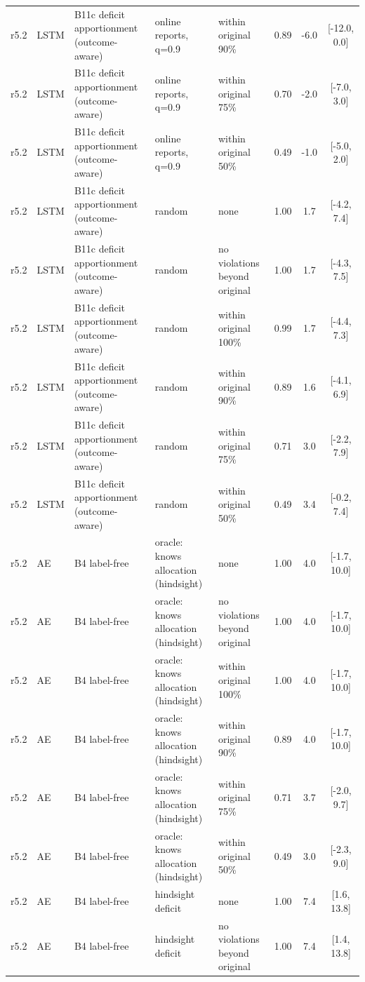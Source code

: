 \begin{longtable}{lllp{4.2cm}p{3.4cm}ccc}
r5.2 & LSTM & B11c deficit apportionment (outcome-aware) & online reports, q=0.9 & within original 90\% & 0.89 & -6.0 & [-12.0, 0.0] \\
r5.2 & LSTM & B11c deficit apportionment (outcome-aware) & online reports, q=0.9 & within original 75\% & 0.70 & -2.0 & [-7.0, 3.0] \\
r5.2 & LSTM & B11c deficit apportionment (outcome-aware) & online reports, q=0.9 & within original 50\% & 0.49 & -1.0 & [-5.0, 2.0] \\
r5.2 & LSTM & B11c deficit apportionment (outcome-aware) & random & none & 1.00 & 1.7 & [-4.2, 7.4] \\
r5.2 & LSTM & B11c deficit apportionment (outcome-aware) & random & no violations beyond original & 1.00 & 1.7 & [-4.3, 7.5] \\
r5.2 & LSTM & B11c deficit apportionment (outcome-aware) & random & within original 100\% & 0.99 & 1.7 & [-4.4, 7.3] \\
r5.2 & LSTM & B11c deficit apportionment (outcome-aware) & random & within original 90\% & 0.89 & 1.6 & [-4.1, 6.9] \\
r5.2 & LSTM & B11c deficit apportionment (outcome-aware) & random & within original 75\% & 0.71 & 3.0 & [-2.2, 7.9] \\
r5.2 & LSTM & B11c deficit apportionment (outcome-aware) & random & within original 50\% & 0.49 & 3.4 & [-0.2, 7.4] \\
r5.2 & AE & B4 label-free & oracle: knows allocation (hindsight) & none & 1.00 & 4.0 & [-1.7, 10.0] \\
r5.2 & AE & B4 label-free & oracle: knows allocation (hindsight) & no violations beyond original & 1.00 & 4.0 & [-1.7, 10.0] \\
r5.2 & AE & B4 label-free & oracle: knows allocation (hindsight) & within original 100\% & 1.00 & 4.0 & [-1.7, 10.0] \\
r5.2 & AE & B4 label-free & oracle: knows allocation (hindsight) & within original 90\% & 0.89 & 4.0 & [-1.7, 10.0] \\
r5.2 & AE & B4 label-free & oracle: knows allocation (hindsight) & within original 75\% & 0.71 & 3.7 & [-2.0, 9.7] \\
r5.2 & AE & B4 label-free & oracle: knows allocation (hindsight) & within original 50\% & 0.49 & 3.0 & [-2.3, 9.0] \\
r5.2 & AE & B4 label-free & hindsight deficit & none & 1.00 & 7.4 & [1.6, 13.8] \\
r5.2 & AE & B4 label-free & hindsight deficit & no violations beyond original & 1.00 & 7.4 & [1.4, 13.8] \\

\end{longtable}
